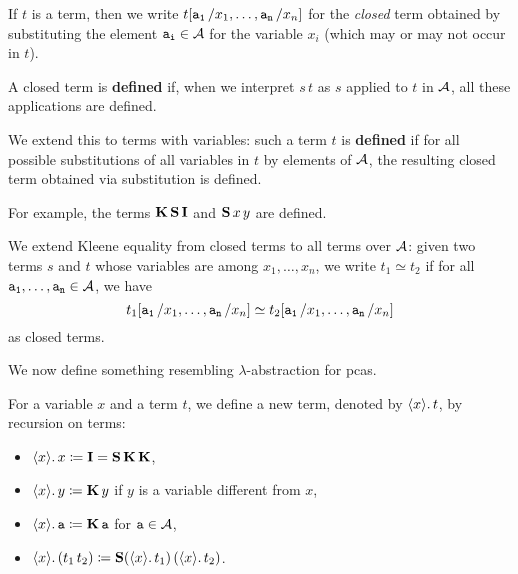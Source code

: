 \begin{notation}
  If \(t\) is a term, then we write \(t[\pca{a_1}/x_1,\dots,\pca{a_n}/x_n]\) for
  the \emph{closed} term obtained by substituting the element
  \(\pca{a_i} \in \AA\) for the variable \(x_i\) (which may or may not occur in
  \(t\)).
\end{notation}

\begin{definition}
  A closed term is \textbf{defined} if, when we interpret \({s\,t}\) as
  \(s\) applied to \(t\) in \(\AA\), all these applications are defined.

  We extend this to terms with variables: such a term \(t\) is \textbf{defined}
  if for all possible substitutions of all variables in \(t\) by elements of
  \(\AA\), the resulting closed term obtained via substitution is defined.
\end{definition}

For example, the terms \(\kcomb\scomb\icomb\) and \(\scomb x\,y\) are defined.

\begin{notation}
  We extend Kleene equality from closed terms to all terms over \(\AA\): given
  two terms \(s\) and \(t\) whose variables are among \(x_1,\dots,x_n\), we
  write \(t_1 \simeq t_2\) if for all \(\pca{a_1},\dots,\pca{a_n} \in \AA\), we
  have
  \[
    t_1[\pca{a_1}/x_1,\dots,\pca{a_n}/x_n] \simeq
    t_2[\pca{a_1}/x_1,\dots,\pca{a_n}/x_n]
  \]
  as closed terms.
\end{notation}

We now define something resembling \(\lambda\)-abstraction for pcas.

\begin{definition}
  For a variable \(x\) and a term \(t\), we define a new term, denoted by
  \(\lambdapca{x}{t}\), by recursion on terms:
  \begin{itemize}
  \item \(\lambdapca{x}{x} \coloneqq \icomb = \scomb\kcomb\kcomb\),
  \item \(\lambdapca{x}{y} \coloneqq \kcomb y\) if \(y\) is a variable different from \(x\),
  \item \(\lambdapca{x}{\pca{a}} \coloneqq \kcomb\pca{a}\) for \(\pca{a} \in \AA\),
  \item \(\lambdapca{x}{(t_1\,t_2)} \coloneqq \scomb(\lambdapca{x}{t_1})\,(\lambdapca{x}{t_2})\).
  \end{itemize}
\end{definition}

